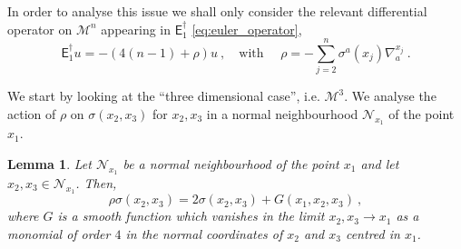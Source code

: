 \documentclass[11pt]{book}
\newcommand{\Mcal}{\mathcal{M}}
\newcommand{\Ncal}{\mathcal{N}}
\newcommand{\Esf}{\mathsf{E}}
\theoremstyle{break}
\newtheorem{lemma}{Lemma}[chapter]
\begin{document}
In order to analyse this issue we shall only consider the relevant differential operator on $\Mcal^n$ appearing in $\Esf_1^\dagger$ \eqref{eq:euler_operator},
%
\begin{equation*}
\Esf_1^\dagger u = - \left( 4(n-1) + \rho \right) u \ , \quad \mbox{with } \quad 
\rho = - \sum_{j=2}^n \sigma^a(x_j) \nabla^{x_j}_a \ .    
\end{equation*}


We start by looking at the ``three dimensional case'', i.e.  $\Mcal^3$. We analyse the action of $\rho$ on $\sigma(x_2,x_3)$ for $x_2,x_3$ in a normal neighbourhood $\Ncal_{x_1}$ of the point $x_1$.


\begin{lemma}\label{lem:rho_over_squared}
Let $\Ncal_{x_1}$ be a normal neighbourhood of the point $x_1$ and let $x_2,x_3 \in \Ncal_{x_1}$. Then,
%
\begin{equation*}
\rho \sigma(x_2,x_3) = 2\sigma(x_2,x_3) + G(x_1,x_2,x_3) \ ,
\end{equation*}
%
where $G$ is a smooth function which vanishes in the limit $x_2,x_3 \to x_1$ as a monomial of order $4$ in the normal coordinates of $x_2$ and $x_3$ centred in $x_1$. 
\end{lemma}
\end{document}
